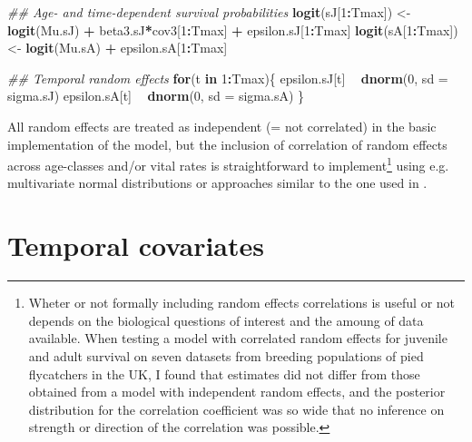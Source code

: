 \documentclass[
]{book}
\newenvironment{Shaded}{\begin{snugshade}}{\end{snugshade}}
\newcommand{\CommentTok}[1]{\textcolor[rgb]{0.56,0.35,0.01}{\textit{#1}}}
\newcommand{\ControlFlowTok}[1]{\textcolor[rgb]{0.13,0.29,0.53}{\textbf{#1}}}
\newcommand{\DataTypeTok}[1]{\textcolor[rgb]{0.13,0.29,0.53}{#1}}
\newcommand{\DecValTok}[1]{\textcolor[rgb]{0.00,0.00,0.81}{#1}}
\newcommand{\KeywordTok}[1]{\textcolor[rgb]{0.13,0.29,0.53}{\textbf{#1}}}
\newcommand{\NormalTok}[1]{#1}
\newcommand{\OperatorTok}[1]{\textcolor[rgb]{0.81,0.36,0.00}{\textbf{#1}}}
\newcommand{\StringTok}[1]{\textcolor[rgb]{0.31,0.60,0.02}{#1}}
\begin{document}
\begin{Shaded}
\begin{Highlighting}[]
\CommentTok{## Age- and time-dependent survival probabilities}
\KeywordTok{logit}\NormalTok{(sJ[}\DecValTok{1}\OperatorTok{:}\NormalTok{Tmax]) <-}\StringTok{ }\KeywordTok{logit}\NormalTok{(Mu.sJ) }\OperatorTok{+}\StringTok{ }\NormalTok{beta3.sJ}\OperatorTok{*}\NormalTok{cov3[}\DecValTok{1}\OperatorTok{:}\NormalTok{Tmax] }\OperatorTok{+}\StringTok{ }\NormalTok{epsilon.sJ[}\DecValTok{1}\OperatorTok{:}\NormalTok{Tmax]}
\KeywordTok{logit}\NormalTok{(sA[}\DecValTok{1}\OperatorTok{:}\NormalTok{Tmax]) <-}\StringTok{ }\KeywordTok{logit}\NormalTok{(Mu.sA) }\OperatorTok{+}\StringTok{ }\NormalTok{epsilon.sA[}\DecValTok{1}\OperatorTok{:}\NormalTok{Tmax]}

\CommentTok{## Temporal random effects}
\ControlFlowTok{for}\NormalTok{(t }\ControlFlowTok{in} \DecValTok{1}\OperatorTok{:}\NormalTok{Tmax)\{}
\NormalTok{     epsilon.sJ[t] }\OperatorTok{~}\StringTok{ }\KeywordTok{dnorm}\NormalTok{(}\DecValTok{0}\NormalTok{, }\DataTypeTok{sd =}\NormalTok{ sigma.sJ)}
\NormalTok{     epsilon.sA[t] }\OperatorTok{~}\StringTok{ }\KeywordTok{dnorm}\NormalTok{(}\DecValTok{0}\NormalTok{, }\DataTypeTok{sd =}\NormalTok{ sigma.sA)}
\NormalTok{\}}
\end{Highlighting}
\end{Shaded}

All random effects are treated as independent (= not correlated) in the basic
implementation of the model, but the inclusion of correlation of random effects
across age-classes and/or vital rates is straightforward to implement\footnote{Wheter or
  not formally including random effects correlations is useful or not depends on
  the biological questions of interest and the amoung of data available. When
  testing a model with correlated random effects for juvenile and adult survival
  on seven datasets from breeding populations of pied flycatchers in the UK, I
  found that estimates did not differ from those obtained from a model with
  independent random effects, and the posterior distribution for the correlation
  coefficient was so wide that no inference on strength or direction of the
  correlation was possible.} using e.g.
multivariate normal distributions or approaches similar to the one used in
\citet{nater2020}.

\hypertarget{temporal-covariates}{%
\section{Temporal covariates}\label{temporal-covariates}}
\end{document}
